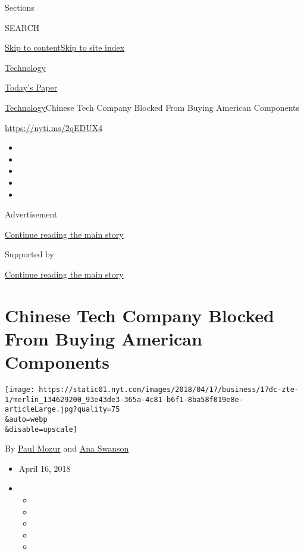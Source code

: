 Sections

SEARCH

\protect\hyperlink{site-content}{Skip to
content}\protect\hyperlink{site-index}{Skip to site index}

\href{https://www.nytimes.com/section/technology}{Technology}

\href{https://myaccount.nytimes.com/auth/login?response_type=cookie\&client_id=vi}{}

\href{https://www.nytimes.com/section/todayspaper}{Today's Paper}

\href{/section/technology}{Technology}\textbar{}Chinese Tech Company
Blocked From Buying American Components

\url{https://nyti.ms/2qEDUX4}

\begin{itemize}
\item
\item
\item
\item
\item
\end{itemize}

Advertisement

\protect\hyperlink{after-top}{Continue reading the main story}

Supported by

\protect\hyperlink{after-sponsor}{Continue reading the main story}

\hypertarget{chinese-tech-company-blocked-from-buying-american-components}{%
\section{Chinese Tech Company Blocked From Buying American
Components}\label{chinese-tech-company-blocked-from-buying-american-components}}

\texttt{[image: https://static01.nyt.com/images/2018/04/17/business/17dc-zte-1/merlin\_134629200\_93e43de3-365a-4c81-b6f1-8ba58f019e8e-articleLarge.jpg?quality=75\\\&auto=webp\\\&disable=upscale]}

By \href{https://www.nytimes.com/by/paul-mozur}{Paul Mozur} and
\href{https://www.nytimes.com/by/ana-swanson}{Ana Swanson}

\begin{itemize}
\item
  April 16, 2018
\item
  \begin{itemize}
  \item
  \item
  \item
  \item
  \item
  \end{itemize}
\end{itemize}

